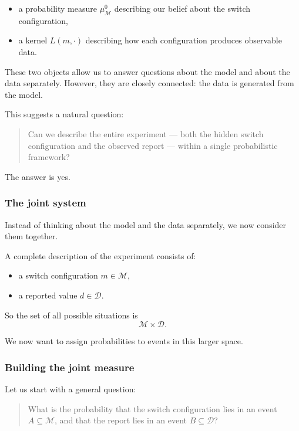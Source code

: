 \documentclass[11pt]{article}
\theoremstyle{remark}
\newcommand{\modelspace}{\mathcal{M}}
\newcommand{\dataspace}{\mathcal{D}}
\begin{document}
\begin{itemize}
    \item a probability measure \(\mu_{\modelspace}^0\) describing our belief about the switch configuration,
    \item a kernel \(L(m,\cdot)\) describing how each configuration produces observable data.
\end{itemize}

These two objects allow us to answer questions about the model and about the data separately. However, they are closely connected: the data is generated from the model.

This suggests a natural question:

\begin{quote}
Can we describe the entire experiment --- both the hidden switch configuration and the observed report --- within a single probabilistic framework?
\end{quote}

The answer is yes.

\vspace{2mm}

\subsubsection{The joint system}

Instead of thinking about the model and the data separately, we now consider them together.

A complete description of the experiment consists of:
\begin{itemize}
    \item a switch configuration \(m \in \modelspace\),
    \item a reported value \(d \in \dataspace\).
\end{itemize}

So the set of all possible situations is
\[
\modelspace \times \dataspace.
\]

We now want to assign probabilities to events in this larger space.

\vspace{2mm}

\subsubsection{Building the joint measure}

Let us start with a general question:

\begin{quote}
What is the probability that the switch configuration lies in an event \(A \subseteq \modelspace\), and that the report lies in an event \(B \subseteq \dataspace\)?
\end{quote}
\end{document}
